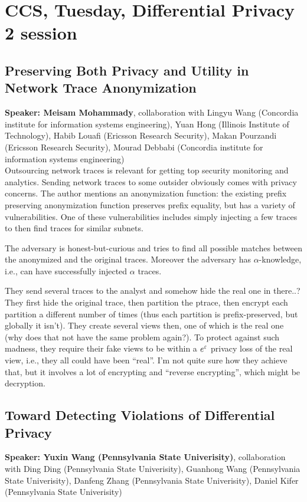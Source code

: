 \documentclass{article}
\begin{document}
\section{CCS, Tuesday, Differential Privacy 2 session}
\subsection{Preserving Both Privacy and Utility in Network Trace Anonymization}
\noindent\textbf{Speaker: Meisam Mohammady}, collaboration with Lingyu Wang (Concordia institute for information systems engineering), Yuan Hong (Illinois Institute of Technology), Habib Louafi (Ericsson Research Security), Makan Pourzandi (Ericsson Research Security), Mourad Debbabi (Concordia institute for information systems engineering)\\

Outsourcing network traces is relevant for getting top security monitoring and analytics. Sending network traces to some outsider obviously comes with privacy concerns.
The author mentions an anonymization function: the existing prefix preserving anonymization function preserves prefix equality, but has a variety of vulnerabilities. One of these vulnerabilities includes simply injecting a few traces to then find traces for similar subnets.

The adversary is honest-but-curious and tries to find all possible matches between the anonymized and the original traces. Moreover the adversary has $\alpha$-knowledge, i.e., can have successfully injected $\alpha$ traces.

They send several traces to the analyst and somehow hide the real one in there..?
They first hide the original trace, then partition the ptrace, then encrypt each partition a different number of times (thus each partition is prefix-preserved, but globally it isn't). They create several views then, one of which is the real one (why does that not have the same problem again?). To protect against such madness, they require their fake views to be within a $e^\varepsilon$ privacy loss of the real view, i.e., they all could have been ``real''. I'm not quite sure how they achieve that, but it involves a lot of encrypting and ``reverse encrypting'', which might be decryption.



\subsection{Toward Detecting Violations of Differential Privacy}
\noindent\textbf{Speaker: Yuxin Wang (Pennsylvania State Univerisity)}, collaboration with Ding Ding (Pennsylvania State Univerisity), Guanhong Wang (Pennsylvania State Univerisity), Danfeng Zhang (Pennsylvania State Univerisity), Daniel Kifer (Pennsylvania State Univerisity)\\
\end{document}
